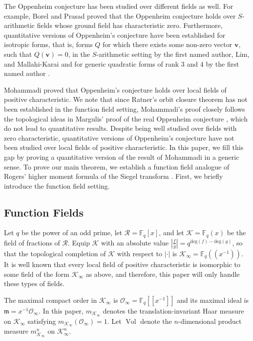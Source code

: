 \documentclass[11pt,a4paper,reqno]{amsart}
\def\deg{\mathrm{deg}}
\theoremstyle{definition}
\theoremstyle{remark}
\numberwithin{equation}{section}
\begin{document}
The Oppenheim conjecture has been studied over different fields as well. For example, Borel and Prasad \cite{BP} proved that the Oppenheim conjecture holds over $S$-arithmetic fields whose ground field has characteristic zero. Furthermore, quantitative versions of Oppenheim's conjecture have been established for isotropic forms, that is, forms $Q$ for which there exists some non-zero vector $\mathbf{v}$, such that $Q(\mathbf{v})=0$, in the $S$-arithmetic setting by the first named author, Lim, and Mallahi-Karai \cite{HLM} and for generic quadratic forms of rank $3$ and $4$ by the first named author \cite{Han3-4}. 

Mohammadi \cite{Moh} proved that Oppenheim's conjecture holds over local fields of positive characteristic. We note that since Ratner's orbit closure theorem \cite{Rat} has not been established in the function field setting, Mohammadi's proof closely follows the topological ideas in Margulis' proof of the real Oppenheim conjecture \cite{Mar}, which do not lead to quantitative results. Despite being well studied over fields with zero characteristic, quantitative versions of Oppenheim's conjecture have not been studied over local fields of positive characteristic. In this paper, we fill this gap by proving a quantitative version of the result of Mohammadi in a generic sense. To prove our main theorem, we establish a function field analogue of Rogers' higher moment formula of the Siegel transform \cite{Rogers1955}. First, we briefly introduce the function field setting.
\subsection{Function Fields}
 Let $q$ be the power of an odd prime, let $\mathcal{R}=\mathbb{F}_q[x]$, and let $\mathcal{K}=\mathbb{F}_q(x)$ be the field of fractions of $\mathcal{R}$. Equip $\mathcal{K}$ with an absolute value $\left|\frac{f}{g}\right|=q^{\deg(f)-\deg(g)}$, so that the topological completion of $\mathcal{K}$ with respect to $\vert \cdot \vert$ is $\mathcal{K}_{\infty}=\mathbb{F}_q(\!(x^{-1})\!)$. It is well known that every local field of positive characteristic is isomorphic to some field of the form $\mathcal{K}_{\infty}$ as above, and therefore, this paper will only handle these types of fields. 
 
 The maximal compact order in $\mathcal{K}_{\infty}$ is $\mathcal{O}_{\infty}=\mathbb{F}_q[[x^{-1}]]$ and its maximal ideal is $\mathfrak{m}=x^{-1}\mathcal{O}_{\infty}$. In this paper, $m_{\mathcal{K}_{\infty}}$ denotes the translation-invariant Haar measure on $\mathcal{K}_{\infty}$ satisfying $m_{\mathcal{K}_{\infty}}\left(\mathcal{O}_{\infty}\right)=1$. Let $\operatorname{Vol}$ denote the $n$-dimensional product measure $m_{\mathcal{K}_{\infty}}^n$ on $\mathcal{K}_{\infty}^n$. 
 
\end{document}

